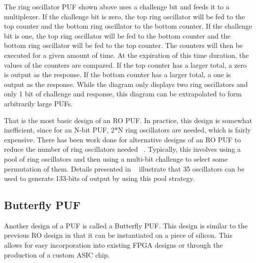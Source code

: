 The ring oscillator PUF shown above uses a challenge bit and feeds it to a multiplexer.
If the challenge bit is zero, the top ring oscillator will be fed to the top counter and
the bottom ring oscillator to the bottom counter. If the challenge bit is one, the top
ring oscillator will be fed to the bottom counter and the bottom ring oscillator will
be fed to the top counter. The counters will then be executed for a given amount of time.
At the expiration of this time duration, the values of the counters are compared. If the
top counter has a larger total, a zero is output as the response. If the bottom counter
has a larger total, a one is output as the response. 
While the diagram only displays two ring oscillators and only 1 bit of challenge and
response, this diagram can be extrapolated to form arbitrarily large PUFs.

That is the most basic design of an RO PUF. In practice, this design is somewhat 
inefficient, since for an N-bit PUF, 2*N ring oscillators are needed, which is fairly
expensive. There has been work done for alternative designs of
an RO PUF to reduce the number of ring oscillators needed ~\cite{aegis_pool}. 
Typically, this involves using
a pool of ring oscillators and then using a multi-bit challenge to select some permutation
of them. Details presented in ~\cite{aegis_pool} illustrate that 35 oscillators can
be used to generate 133-bits of output by using this pool strategy.

\subsection{Butterfly PUF}
Another design of a PUF is called a Butterfly PUF. This design is similar to the previous
RO design in that it can be instantiated on a piece of silicon. This allows for easy
incorporation into existing FPGA designs or through the production of a custom ASIC chip.



